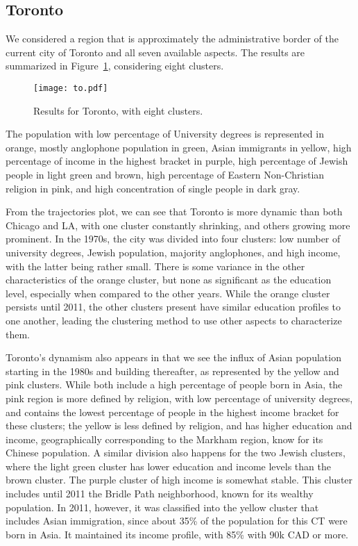 \subsection{Toronto}

We considered a region that is approximately the administrative border of the
current city of Toronto and all seven available aspects. The results are
summarized in Figure~\ref{fig:to}, considering eight clusters.

\begin{figure}
    \centering 
    \texttt{[image: to.pdf]}
    \caption{Results for Toronto, with eight clusters.\label{fig:to}}
\end{figure}

The population with low percentage of University degrees is represented in
orange, mostly anglophone population in green, Asian immigrants in yellow, high
percentage of income in the highest bracket in purple, high percentage of Jewish
people in light green and brown, high percentage of Eastern Non-Christian
religion in pink, and high concentration of single people in dark gray. 


From the trajectories plot, we can see that Toronto is more dynamic than both
Chicago and LA, with one cluster constantly shrinking, and others growing more
prominent. In the 1970s, the city was divided into four clusters: low number of
university degrees, Jewish population, majority anglophones, and high income,
with the latter being rather small. There is some variance in the other
characteristics of the orange cluster, but none as significant as the education
level, especially when compared to the other years. While the orange cluster
persists until 2011, the other clusters present have similar education profiles
to one another, leading the clustering method to use other aspects to
characterize them.

Toronto's dynamism also appears in that we see the influx of Asian population
starting in the 1980s and building thereafter, as represented by the yellow and
pink clusters. While both include a high percentage of people born in Asia, the
pink region is more defined by religion, with low percentage of university
degrees, and contains the lowest percentage  of people in the highest income
bracket for these clusters; the yellow is less defined by religion, and has
higher education and income, geographically corresponding to the Markham region,
know for its Chinese population. A similar division also happens for the two
Jewish clusters, where the light green cluster has lower education and income
levels than the brown cluster. The purple cluster of high income is somewhat
stable. This cluster includes until 2011 the Bridle Path neighborhood, known for
its wealthy population.  In 2011, however, it was classified into the yellow
cluster that includes Asian immigration, since about 35\% of the population for
this CT were born in Asia.  It maintained its income profile, with 85\% with 90k
CAD or more.


